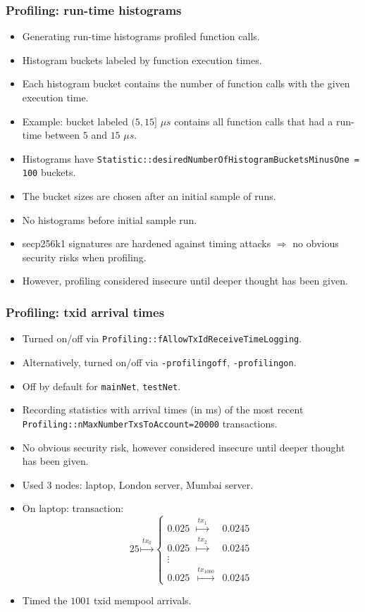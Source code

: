 \begin{frame}[fragile]
\frametitle{Profiling: run-time histograms}
\begin{itemize}
\item Generating run-time histograms profiled function calls. 
\item Histogram buckets labeled by function execution times.
\item Each histogram bucket contains the number of function calls with the given execution time.
\item Example: bucket labeled $(5,15]$ $\mu s$ contains all function calls that had a run-time between $5$ and $15$ $\mu s$.
\item Histograms have \verb|Statistic::desiredNumberOfHistogramBucketsMinusOne = 100| buckets.
\item The bucket sizes are chosen after an initial sample of runs.
\item No histograms before initial sample run.
\item secp256k1 signatures are hardened against timing attacks $\Rightarrow$ no obvious security risks when profiling.
\item However, profiling considered insecure until deeper thought has been given.
\end{itemize}
\end{frame}
\begin{frame}[fragile]
\frametitle{Profiling: txid arrival times}
\begin{itemize}
\item Turned on/off via \verb|Profiling::fAllowTxIdReceiveTimeLogging|.
\item Alternatively, turned on/off via  \verb|-profilingoff|, \verb|-profilingon|.
\item Off by default for \verb|mainNet|, \verb|testNet|.
\item Recording statistics with arrival times (in ms) of the most recent \verb|Profiling::nMaxNumberTxsToAccount=20000| transactions.
\item No obvious security risk, however considered insecure until deeper thought has been given.
\item Used 3 nodes: laptop, London server, Mumbai server.
\item On laptop: transaction:
\[
25 \stackrel{tx_0}{\mapsto} \left\{\begin{array}{lcl}
0.025 & \stackrel{tx_1}{\mapsto}& 0.0245 \\
0.025 & \stackrel{tx_2}{\mapsto}& 0.0245\\
\vdots\\
0.025 & \stackrel{tx_{1000}}{\mapsto}& 0.0245
\end{array} \right.
\]
\item Timed the $1001$ txid mempool arrivals.

\end{itemize}
\end{frame}


